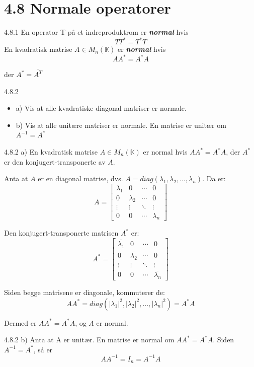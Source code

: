 \documentclass[a4paper,norsk]{article}
\begin{document}
\section*{4.8 Normale operatorer}


\begin{definitionbox}{4.8.1}{}
En operator T på et indreproduktrom er \textbf{\textit{normal}} hvis
$$
TT^* = T^*T
$$
En kvadratisk matrise $A \in M_n(\mathbb{K})$ er \textbf{\textit{normal}} hvis
$$
AA^* = A^*A
$$

der $A^* = \overline{A^T}$
\end{definitionbox}


\begin{oppgavebox}{4.8.2}{}
\begin{itemize}
    \item a) Vis at alle kvadratiske diagonal matriser er normale.
    \item b) Vis at alle unitære matriser er normale. En matrise er unitær om $ A^{-1} = A^* $
\end{itemize}

\begin{proofbox}{4.8.2 a)}{}
En kvadratisk matrise $ A \in M_n(\mathbb{K}) $ er normal hvis $ AA^* = A^*A $, der $ A^* $ er den konjugert-transponerte av $ A $.

Anta at $ A $ er en diagonal matrise, dvs. $ A = diag(\lambda_1, \lambda_2, \dots, \lambda_n) $. Da er:
\[
A = \begin{bmatrix}
\lambda_1 & 0 & \cdots & 0 \\
0 & \lambda_2 & \cdots & 0 \\
\vdots & \vdots & \ddots & \vdots \\
0 & 0 & \cdots & \lambda_n
\end{bmatrix}
\]

Den konjugert-transponerte matrisen $ A^* $ er:
\[
A^* = \begin{bmatrix}
\overline{\lambda_1} & 0 & \cdots & 0 \\
0 & \overline{\lambda_2} & \cdots & 0 \\
\vdots & \vdots & \ddots & \vdots \\
0 & 0 & \cdots & \overline{\lambda_n}
\end{bmatrix}
\]

Siden begge matrisene er diagonale, kommuterer de:
\[
AA^* = diag (|\lambda_1|^2, |\lambda_2|^2, \dots, |\lambda_n|^2) = A^*A
\]

Dermed er $ AA^* = A^*A $, og $ A $ er normal.
\end{proofbox}

\begin{proofbox}{4.8.2 b)}{}
    Anta at A er unitær. En matrise er normal om $ AA^* = A^*A $. Siden $ A^{-1}=A^* $, så er 
    \[
        A A^{-1} = I_n = A^{-1}A
    \]
    
\end{proofbox}
\end{oppgavebox}
\end{document}
